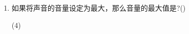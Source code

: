\documentclass[10.5pt, a4paper]{article}
\begin{document}
\begin{enumerate}
        
        \item 如果将声音的音量设定为最大，那么音量的最大值是?(\qquad)
        \begin{tasks}(4)
        \end{tasks}
    \end{enumerate}

\end{document}
